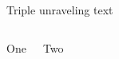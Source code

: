 \begin{frame}{Triple unraveling text}


    \begin{columns}

        \begin{center}
        {\Huge{} One\par}
        \end{center}

        \begin{center}
        {\Huge{} Two\par}
        \end{center}
    \end{columns}
        \vspace{\fill}


\end{frame}
